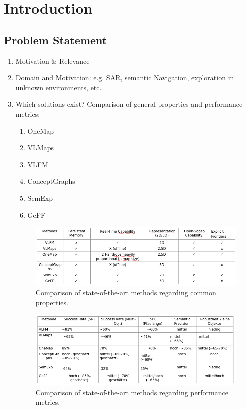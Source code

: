 \chapter{Introduction}
\section{Problem Statement}
\begin{enumerate}
    \item Motivation \& Relevance
    \item Domain and Motivation: e.g. \ac{SAR}, semantic Navigation, exploration in unknown environments, etc.
    \item Which solutions exist? Comparison of general properties and performance metrics:
    \begin{enumerate}
        \item \ac{OneMap} \cite{busch2025onemap}
        \item \ac{VLMaps} \cite{huang23vlmaps}
        \item \ac{VLFM} \cite{yokoyama2024vlfm}
        \item \ac{ConceptGraphs} \cite{gu2023conceptgraphsopenvocabulary3dscene}
        \item \ac{SemExp} \cite{chaplot2020semexp}
        \item \ac{GeFF} \cite{qui2024geff}
    \end{enumerate}

    \begin{figure}[!ht]
    \centering
    \includegraphics[width=\textwidth]{Images/1_introduction/temp_sota_comparison_common_properties.png}
    \caption{Comparison of state-of-the-art methods regarding common properties.}
    \label{fig:sota_comparison}
    \end{figure}

    \begin{figure}[!ht]
    \centering
    \includegraphics[width=\textwidth]{Images/1_introduction/temp_sota_comparison_performance_metrics.png}
    \caption{Comparison of state-of-the-art methods regarding performance metrics.}
    \label{fig:sota_performance}
    \end{figure}


\end{enumerate}
